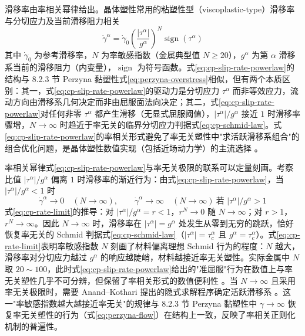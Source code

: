 滑移率由率相关幂律给出。晶体塑性常用的粘塑性型（viscoplastic-type）滑移率与分切应力及当前滑移阻力相关
\begin{equation}
  \dot{\gamma}^{\alpha}=\dot{\gamma}_{0}
  \left(\frac{|\tau^{\alpha}|}{g^{\alpha}}\right)^{N}
  \operatorname{sign}(\tau^{\alpha})
  \label{eq:cp-slip-rate-powerlaw}
\end{equation}
其中 $\dot{\gamma}_{0}$ 为参考滑移率，$N$ 为率敏感指数（金属典型值 $N\ge 20$），$g^{\alpha}$ 为第 $\alpha$ 滑移系当前的滑移阻力（内变量），$\operatorname{sign}$ 为符号函数。式\eqref{eq:cp-slip-rate-powerlaw}的结构与 8.2.3 节 Perzyna 黏塑性式\eqref{eq:perzyna-overstress}相似，但有两个本质区别：其一，式\eqref{eq:cp-slip-rate-powerlaw}的驱动力是分切应力 $\tau^{\alpha}$ 而非等效应力，流动方向由滑移系几何决定而非由屈服面法向决定；其二，式\eqref{eq:cp-slip-rate-powerlaw}对任何非零 $\tau^{\alpha}$ 都产生滑移（无显式屈服阈值），$|\tau^{\alpha}|/g^{\alpha}$ 接近 $1$ 时滑移率骤增，$N\to\infty$ 时趋近于率无关的临界分切应力判据式\eqref{eq:cp-schmid-law}。式\eqref{eq:cp-slip-rate-powerlaw}的率相关形式避免了率无关塑性中"求活跃滑移系组合"的组合优化问题，是晶体塑性数值实现（包括近场动力学）的主流选择 \cite{Peirce1983,Kalidindi1992}。

率相关幂律式\eqref{eq:cp-slip-rate-powerlaw}与率无关极限的联系可以定量刻画。考察比值 $|\tau^{\alpha}|/g^{\alpha}$ 偏离 $1$ 时滑移率的渐近行为：由式\eqref{eq:cp-slip-rate-powerlaw}，当 $|\tau^{\alpha}|/g^{\alpha}<1$ 时
\begin{equation}
  \dot{\gamma}^{\alpha}\to 0\quad(N\to\infty),\qquad
  \dot{\gamma}^{\alpha}\to\infty\quad(N\to\infty)\ \text{若 }|\tau^{\alpha}|/g^{\alpha}>1
  \label{eq:cp-rate-limit}
\end{equation}
式\eqref{eq:cp-rate-limit}的推导：对 $|\tau^{\alpha}|/g^{\alpha}=r<1$，$r^{N}\to0$ 随 $N\to\infty$；对 $r>1$，$r^{N}\to\infty$。因此 $N\to\infty$ 时，滑移率在 $|\tau^{\alpha}|=g^{\alpha}$ 处发生从零到无穷的跳跃，恰好恢复率无关的 Schmid 判据式\eqref{eq:cp-schmid-law}（$|\tau^{\alpha}|=\tau_{c}^{\alpha}$ 且 $g^{\alpha}=\tau_{c}^{\alpha}$）。式\eqref{eq:cp-rate-limit}表明率敏感指数 $N$ 刻画了材料偏离理想 Schmid 行为的程度：$N$ 越大，滑移率对分切应力越过 $g^{\alpha}$ 的响应越陡峭，材料越接近率无关塑性。实际金属中 $N$ 取 $20\sim100$，此时式\eqref{eq:cp-slip-rate-powerlaw}给出的"准屈服"行为在数值上与率无关塑性几乎不可分辨，但保留了率相关形式的数值便利性 \cite{Peirce1983,Kalidindi1992}。当 $N\to\infty$ 且采用率无关极限时，需要 Anand--Kothari 提出的隐式求解程序确定活跃滑移系 \cite{Anand1996}。这一"率敏感指数越大越接近率无关"的规律与 8.2.3 节 Perzyna 黏塑性中 $\gamma\to\infty$ 恢复率无关塑性的行为（式\eqref{eq:perzyna-flow}）在结构上一致，反映了率相关正则化机制的普遍性。

